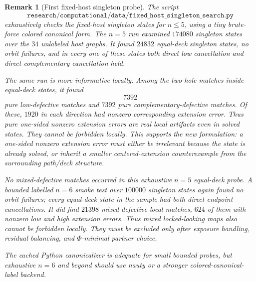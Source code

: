 \documentclass[11pt]{article}
\newtheorem{remark}{Remark}
\begin{document}
\begin{remark}[First fixed-host singleton probe]
The script
\[
  \texttt{research/computational/data/fixed\_host\_singleton\_search.py}
\]
exhaustively checks the fixed-host singleton states for \(n\leq 5\), using a
tiny brute-force colored canonical form.  The \(n=5\) run examined \(174080\)
singleton states over the \(34\) unlabeled host graphs.  It found \(24832\)
equal-deck singleton states, no orbit failures, and in every one of these
states both direct low cancellation and direct complementary cancellation held.

The same run is more informative locally.  Among the two-hole matches inside
equal-deck states, it found
\[
  7392
\]
pure low-defective matches and \(7392\) pure complementary-defective matches.
Of these, \(1920\) in each direction had nonzero corresponding extension
error.  Thus pure one-sided nonzero extension errors are real local artifacts
even in solved states.  They cannot be forbidden locally.  This supports the
new formulation: a one-sided nonzero extension error must either be irrelevant
because the state is already solved, or inherit a smaller centered-extension
counterexample from the surrounding path/deck structure.

No mixed-defective matches occurred in this exhaustive \(n=5\) equal-deck
probe.  A bounded labelled \(n=6\) smoke test over \(100000\) singleton states
again found no orbit failures; every equal-deck state in the sample had both
direct endpoint cancellations.  It did find \(21398\) mixed-defective local
matches, \(624\) of them with nonzero low and high extension errors.  Thus
mixed locked-looking maps also cannot be forbidden locally.  They must be
excluded only after exposure
handling, residual balancing, and \(\Phi\)-minimal partner choice.

The cached Python canonicalizer is adequate for small bounded probes, but
exhaustive \(n=6\) and beyond should use nauty or a stronger
colored-canonical-label backend.
\end{remark}
\end{document}
